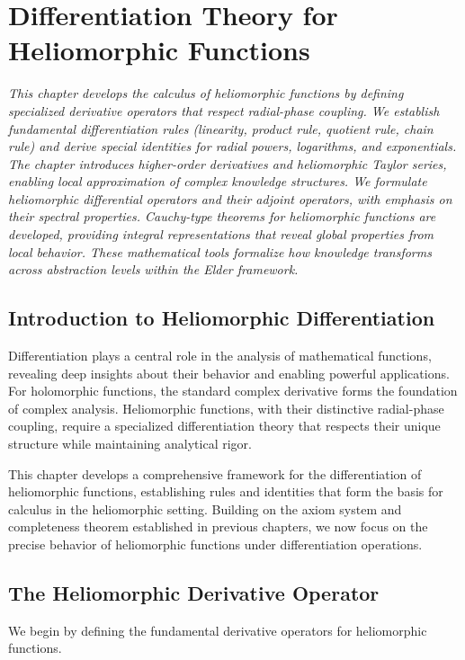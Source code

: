 \chapter{Differentiation Theory for Heliomorphic Functions}

\textit{This chapter develops the calculus of heliomorphic functions by defining specialized derivative operators that respect radial-phase coupling. We establish fundamental differentiation rules (linearity, product rule, quotient rule, chain rule) and derive special identities for radial powers, logarithms, and exponentials. The chapter introduces higher-order derivatives and heliomorphic Taylor series, enabling local approximation of complex knowledge structures. We formulate heliomorphic differential operators and their adjoint operators, with emphasis on their spectral properties. Cauchy-type theorems for heliomorphic functions are developed, providing integral representations that reveal global properties from local behavior. These mathematical tools formalize how knowledge transforms across abstraction levels within the Elder framework.}

\section{Introduction to Heliomorphic Differentiation}

Differentiation plays a central role in the analysis of mathematical functions, revealing deep insights about their behavior and enabling powerful applications. For holomorphic functions, the standard complex derivative forms the foundation of complex analysis. Heliomorphic functions, with their distinctive radial-phase coupling, require a specialized differentiation theory that respects their unique structure while maintaining analytical rigor.

This chapter develops a comprehensive framework for the differentiation of heliomorphic functions, establishing rules and identities that form the basis for calculus in the heliomorphic setting. Building on the axiom system and completeness theorem established in previous chapters, we now focus on the precise behavior of heliomorphic functions under differentiation operations.

\section{The Heliomorphic Derivative Operator}

We begin by defining the fundamental derivative operators for heliomorphic functions.

